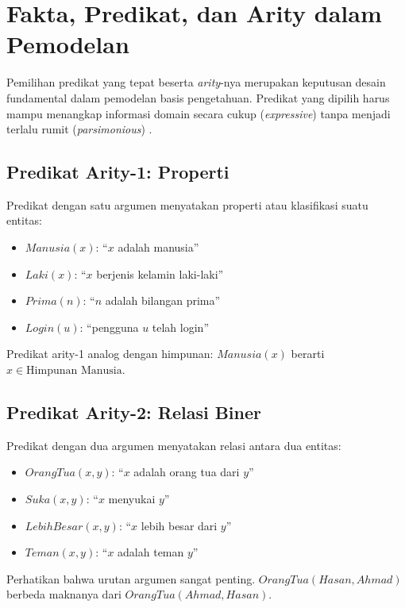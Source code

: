 \section{Fakta, Predikat, dan Arity dalam Pemodelan}

Pemilihan predikat yang tepat beserta \textit{arity}-nya merupakan keputusan desain fundamental dalam pemodelan basis pengetahuan. Predikat yang dipilih harus mampu menangkap informasi domain secara cukup (\textit{expressive}) tanpa menjadi terlalu rumit (\textit{parsimonious}) \cite{rosen2019}.

\subsection{Predikat Arity-1: Properti}

Predikat dengan satu argumen menyatakan properti atau klasifikasi suatu entitas:

\begin{itemize}
    \item $Manusia(x)$: ``$x$ adalah manusia''
    \item $Laki(x)$: ``$x$ berjenis kelamin laki-laki''
    \item $Prima(n)$: ``$n$ adalah bilangan prima''
    \item $Login(u)$: ``pengguna $u$ telah login''
\end{itemize}

Predikat arity-1 analog dengan himpunan: $Manusia(x)$ berarti $x \in \text{Himpunan Manusia}$.

\subsection{Predikat Arity-2: Relasi Biner}

Predikat dengan dua argumen menyatakan relasi antara dua entitas:

\begin{itemize}
    \item $OrangTua(x, y)$: ``$x$ adalah orang tua dari $y$''
    \item $Suka(x, y)$: ``$x$ menyukai $y$''
    \item $LebihBesar(x, y)$: ``$x$ lebih besar dari $y$''
    \item $Teman(x, y)$: ``$x$ adalah teman $y$''
\end{itemize}

Perhatikan bahwa urutan argumen sangat penting. $OrangTua(Hasan, Ahmad)$ berbeda maknanya dari $OrangTua(Ahmad, Hasan)$.

